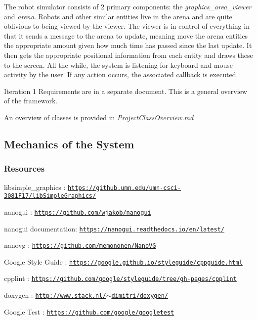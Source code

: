 The robot simulator consists of 2 primary components\+: the {\itshape graphics\+\_\+area\+\_\+viewer} and {\itshape arena}. Robots and other similar entities live in the arena and are quite oblivious to being viewed by the viewer. The viewer is in control of everything in that it sends a message to the arena to update, meaning move the arena entities the appropriate amount given how much time has passed since the last update. It then gets the appropriate positional information from each entity and draws these to the screen. All the while, the system is listening for keyboard and mouse activity by the user. If any action occurs, the associated callback is executed.





Iteration 1 Requirements are in a separate document. This is a general overview of the framework.

An overview of classes is provided in {\itshape Project\+Class\+Overview.\+md}





\subsection*{Mechanics of the System}

\subsubsection*{Resources}


\begin{DoxyItemize}
\item libsimple\+\_\+graphics \+: \href{https://github.umn.edu/umn-csci-3081F17/libSimpleGraphics/}{\tt https\+://github.\+umn.\+edu/umn-\/csci-\/3081\+F17/lib\+Simple\+Graphics/}
\item nanogui \+: \href{https://github.com/wjakob/nanogui}{\tt https\+://github.\+com/wjakob/nanogui}
\item nanogui documentation\+: \href{https://nanogui.readthedocs.io/en/latest/}{\tt https\+://nanogui.\+readthedocs.\+io/en/latest/}
\item nanovg \+: \href{https://github.com/memononen/NanoVG}{\tt https\+://github.\+com/memononen/\+Nano\+VG}
\item Google Style Guide \+: \href{https://google.github.io/styleguide/cppguide.html}{\tt https\+://google.\+github.\+io/styleguide/cppguide.\+html}
\item cpplint \+: \href{https://github.com/google/styleguide/tree/gh-pages/cpplint}{\tt https\+://github.\+com/google/styleguide/tree/gh-\/pages/cpplint}
\item doxygen \+: \href{http://www.stack.nl/~dimitri/doxygen/}{\tt http\+://www.\+stack.\+nl/$\sim$dimitri/doxygen/}
\item Google Test \+: \href{https://github.com/google/googletest}{\tt https\+://github.\+com/google/googletest}
\end{DoxyItemize}

